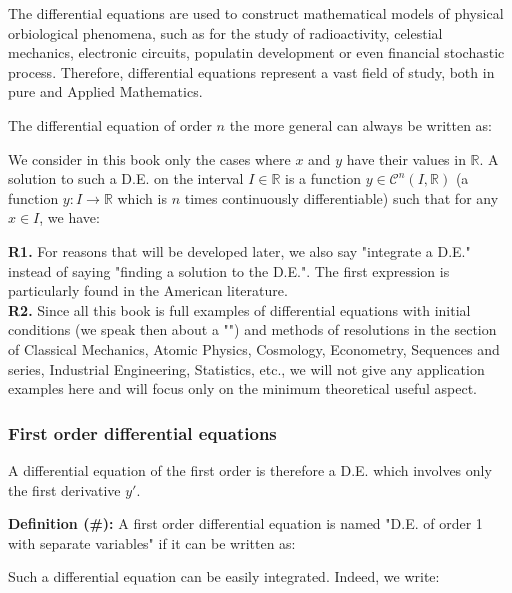 	\begin{tcolorbox}[title=Remark,colframe=black,arc=10pt]
	The differential equations are used to construct mathematical models of physical orbiological phenomena, such as for the study of radioactivity, celestial mechanics, electronic circuits, populatin development or even financial stochastic process. Therefore, differential equations represent a vast field of study, both in pure and Applied Mathematics.
	\end{tcolorbox}
	The differential equation of order $n$ the more general can always be written as:
	
	We consider in this book only the cases where $x$ and $y$ have their values in $\mathbb{R}$. A solution to such a D.E. on the interval $I \in \mathbb{R}$ is a function $y \in \mathcal{C}^n (I,\mathbb{R})$ (a function $y:I \rightarrow \mathbb{R}$ which is $n$ times continuously differentiable) such that for any $x \in I$, we have:
	
	\begin{tcolorbox}[title=Remarks,colframe=black,arc=10pt]
	\textbf{R1.} For reasons that will be developed later, we also say "integrate a D.E." instead of saying "finding a solution to the D.E.". The first expression is particularly found in the American literature.\\
	
	\textbf{R2.} Since all this book is full examples of differential equations with initial conditions (we speak then about a "") and methods of resolutions in the section of Classical Mechanics, Atomic Physics, Cosmology, Econometry, Sequences and series, Industrial Engineering, Statistics, etc., we will not give any application examples here and will focus only on the minimum theoretical useful aspect.
	\end{tcolorbox}
	
	\pagebreak
	\subsubsection{First order differential equations}\label{first order differential equations}
	A differential equation of the first order is therefore a D.E. which involves only the first derivative $y'$.
	
	\textbf{Definition (\#\mydef):} A first order differential equation is named "D.E. of order 1 with separate variables" if it can be written as:
	
	Such a differential equation can be easily integrated. Indeed, we write:
	
